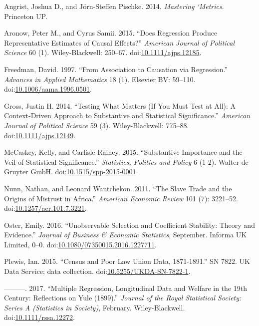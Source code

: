 \documentclass[]{article}
\begin{document}
\hypertarget{refs}{}
\hypertarget{ref-AngristPischke2014a}{}
Angrist, Joshua D., and Jörn-Steffen Pischke. 2014. \emph{Mastering
`Metrics}. Princeton UP.

\hypertarget{ref-AronowSamii2015a}{}
Aronow, Peter M., and Cyrus Samii. 2015. ``Does Regression Produce
Representative Estimates of Causal Effects?'' \emph{American Journal of
Political Science} 60 (1). Wiley-Blackwell: 250--67.
doi:\href{https://doi.org/10.1111/ajps.12185}{10.1111/ajps.12185}.

\hypertarget{ref-Freedman_1997}{}
Freedman, David. 1997. ``From Association to Causation via Regression.''
\emph{Advances in Applied Mathematics} 18 (1). Elsevier BV: 59--110.
doi:\href{https://doi.org/10.1006/aama.1996.0501}{10.1006/aama.1996.0501}.

\hypertarget{ref-Gross2014a}{}
Gross, Justin H. 2014. ``Testing What Matters (If You Must Test at All):
A Context-Driven Approach to Substantive and Statistical Significance.''
\emph{American Journal of Political Science} 59 (3). Wiley-Blackwell:
775--88.
doi:\href{https://doi.org/10.1111/ajps.12149}{10.1111/ajps.12149}.

\hypertarget{ref-McCaskeyRainey2015a}{}
McCaskey, Kelly, and Carlisle Rainey. 2015. ``Substantive Importance and
the Veil of Statistical Significance.'' \emph{Statistics, Politics and
Policy} 6 (1-2). Walter de Gruyter GmbH.
doi:\href{https://doi.org/10.1515/spp-2015-0001}{10.1515/spp-2015-0001}.

\hypertarget{ref-NunnWantchekon2011a}{}
Nunn, Nathan, and Leonard Wantchekon. 2011. ``The Slave Trade and the
Origins of Mistrust in Africa.'' \emph{American Economic Review} 101
(7): 3221--52.
doi:\href{https://doi.org/10.1257/aer.101.7.3221}{10.1257/aer.101.7.3221}.

\hypertarget{ref-Oster2016a}{}
Oster, Emily. 2016. ``Unobservable Selection and Coefficient Stability:
Theory and Evidence.'' \emph{Journal of Business \& Economic
Statistics}, September. Informa UK Limited, 0--0.
doi:\href{https://doi.org/10.1080/07350015.2016.1227711}{10.1080/07350015.2016.1227711}.

\hypertarget{ref-Plewis2015a}{}
Plewis, Ian. 2015. ``Census and Poor Law Union Data, 1871-1891.'' SN
7822. UK Data Service; data collection.
doi:\href{https://doi.org/10.5255/UKDA-SN-7822-1}{10.5255/UKDA-SN-7822-1}.

\hypertarget{ref-Plewis2017a}{}
---------. 2017. ``Multiple Regression, Longitudinal Data and Welfare in
the 19th Century: Reflections on Yule (1899).'' \emph{Journal of the
Royal Statistical Society: Series A (Statistics in Society)}, February.
Wiley-Blackwell.
doi:\href{https://doi.org/10.1111/rssa.12272}{10.1111/rssa.12272}.
\end{document}
